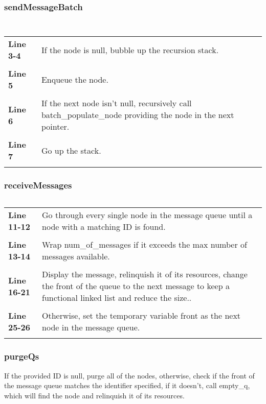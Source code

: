 \documentclass[a4paper, 12pt, titlepage]{article}
\newenvironment{code}{\captionsetup{type=listing}}{}
\newcommand{\sourcecode}[3]{
    \begin{code}
      \inputminted[linenos,numbersep=5pt,gobble=0,frame=lines,framesep=2mm,]{c}{#1}
        \caption{#2}
        \label{lst: #3}
    \end{code}
  }
\newcommand{\explainline}[2]{
  \textbf{Line #1} & #2 \\ \\
}
\begin{document}
\begin{onehalfspacing}
   \subsubsection{sendMessageBatch}

   \sourcecode{snippets/task2b/sendMessageBatch.c}{sendMessageBatch method implementation}{task2b_sendMessageBatch}


    \sourcecode{snippets/task2b/batchPopulateNode.c}{batchPopulateNode helper function}{batchPopulateNode}

    \begin{longtable}{l p{10cm}}
      \explainline{3-4}{If the node is null, bubble up the recursion stack.}
      \explainline{5}{Enqueue the node.}
      \explainline{6}{If the next node isn't null, recursively call batch\_populate\_node providing the node in the next pointer.}
      \explainline{7}{Go up the stack.}


   \end{longtable}


   \subsubsection{receiveMessages}

   \sourcecode{snippets/task2b/receiveMessages.c}{receiveMessages method implementation}{task2b_receiveMessages}

   \begin{longtable}{l p{10cm}}
      \explainline{11-12}{Go through every single node in the message queue until a node with a matching ID is found.}
      \explainline{13-14}{Wrap num\_of\_messages if it exceeds the max number of messages available.}
      \explainline{16-21}{Display the message, relinquish it of its resources, change the front of the queue to the next message to keep a functional linked list and reduce the size..}
      \explainline{25-26}{Otherwise, set the temporary variable front as the next node in the message queue.}
   \end{longtable}
   \subsubsection{purgeQs}
   If the provided ID is null, purge all of the nodes, otherwise, check if the front of the message queue matches the identifier specified, if it doesn't, call empty\_q, which will find the node and relinquish it of its resources.
   \sourcecode{snippets/task2b/purgeQs.c}{purgeQs method implementation}{task2b_purgeQs}


\end{onehalfspacing}
\end{document}
